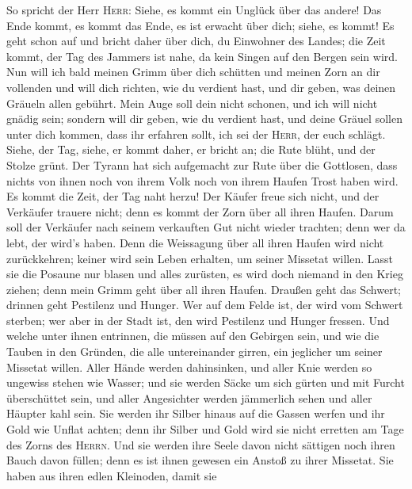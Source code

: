  So spricht der Herr \textsc{Herr}: Siehe, es kommt ein
Unglück über das andere!  Das Ende kommt, es kommt das
Ende, es ist erwacht über dich; siehe, es kommt!  Es geht
schon auf und bricht daher über dich, du Einwohner des Landes; die Zeit
kommt, der Tag des Jammers ist nahe, da kein Singen auf den Bergen sein
wird.  Nun will ich bald meinen Grimm über dich schütten
und meinen Zorn an dir vollenden und will dich richten, wie du verdient
hast, und dir geben, was deinen Gräueln allen gebührt. 
Mein Auge soll dein nicht schonen, und ich will nicht gnädig sein;
sondern will dir geben, wie du verdient hast, und deine Gräuel sollen
unter dich kommen, dass ihr erfahren sollt, ich sei der \textsc{Herr},
der euch schlägt.  Siehe, der Tag, siehe, er kommt daher,
er bricht an; die Rute blüht, und der Stolze grünt.  Der
Tyrann hat sich aufgemacht zur Rute über die Gottlosen, dass nichts von
ihnen noch von ihrem Volk noch von ihrem Haufen Trost haben wird.
 Es kommt die Zeit, der Tag naht herzu! Der Käufer freue
sich nicht, und der Verkäufer trauere nicht; denn es kommt der Zorn über
all ihren Haufen.  Darum soll der Verkäufer nach seinem
verkauften Gut nicht wieder trachten; denn wer da lebt, der wird's
haben. Denn die Weissagung über all ihren Haufen wird nicht
zurückkehren; keiner wird sein Leben erhalten, um seiner Missetat
willen.  Lasst sie die Posaune nur blasen und alles
zurüsten, es wird doch niemand in den Krieg ziehen; denn mein Grimm geht
über all ihren Haufen.  Draußen geht das Schwert; drinnen
geht Pestilenz und Hunger. Wer auf dem Felde ist, der wird vom Schwert
sterben; wer aber in der Stadt ist, den wird Pestilenz und Hunger
fressen.  Und welche unter ihnen entrinnen, die müssen
auf den Gebirgen sein, und wie die Tauben in den Gründen, die alle
untereinander girren, ein jeglicher um seiner Missetat willen.
 Aller Hände werden dahinsinken, und aller Knie werden so
ungewiss stehen wie Wasser;  und sie werden Säcke um sich
gürten und mit Furcht überschüttet sein, und aller Angesichter werden
jämmerlich sehen und aller Häupter kahl sein.  Sie werden
ihr Silber hinaus auf die Gassen werfen und ihr Gold wie Unflat achten;
denn ihr Silber und Gold wird sie nicht erretten am Tage des Zorns des
\textsc{Herrn}. Und sie werden ihre Seele davon nicht sättigen noch
ihren Bauch davon füllen; denn es ist ihnen gewesen ein Anstoß zu ihrer
Missetat.  Sie haben aus ihren edlen Kleinoden, damit sie
